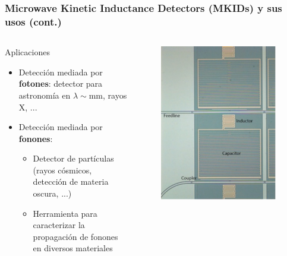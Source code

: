 \documentclass{beamer}
\begin{document}
\begin{frame}
\frametitle{Microwave Kinetic Inductance Detectors (MKIDs) y sus usos
(cont.)}
\begin{columns}
\begin{column}{0.55\textwidth}
\begin{alertblock}{Aplicaciones}
\begin{itemize}
\item Detección mediada por \textbf{fotones}: detector
				para astronomía en $\lambda \sim \text{mm}$, rayos X, ...
\item Detección mediada por \textbf{fonones}:
\begin{itemize}
				\item Detector de partículas (rayos cósmicos, detección de materia oscura, ...)
				\item Herramienta para caracterizar la propagación de fonones en diversos materiales
												\end{itemize}
				\end{itemize}
				\end{alertblock}
\end{column} \ \
\begin{column}{0.45\textwidth}
				\includegraphics[width=0.8\textwidth]{otra_foto_mkid_mazin}
								\end{column}
				\end{columns}

\end{frame}
\end{document}
